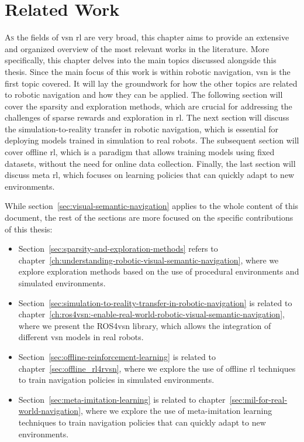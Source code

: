 \chapter{Related Work}\label{ch:related-work}

\lettrine{\textcolor{accent_color}{A}}{s} the fields of \acrshort{vsn} \acrshort{rl} are very broad, this chapter aims to provide an extensive and organized overview of the most relevant works in the literature.
More specifically, this chapter delves into the main topics discussed alongside this thesis.
Since the main focus of this work is within robotic navigation, \acrlong{vsn} is the first topic covered.
It will lay the groundwork for how the other topics are related to robotic navigation and how they can be applied.
The following section will cover the sparsity and exploration methods, which are crucial for addressing the challenges of sparse rewards and exploration in \acrshort{rl}.
The next section will discuss the simulation-to-reality transfer in robotic navigation, which is essential for deploying models trained in simulation to real robots.
The subsequent section will cover offline \acrshort{rl}, which is a paradigm that allows training models using fixed datasets, without the need for online data collection.
Finally, the last section will discuss meta \acrshort{rl}, which focuses on learning policies that can quickly adapt to new environments.

While section~\ref{sec:visual-semantic-navigation} applies to the whole content of this document, the rest of the sections are more focused on the specific contributions of this thesis:

\begin{itemize}
    \item Section~\ref{sec:sparsity-and-exploration-methods} refers to chapter~\ref{ch:understanding-robotic-visual-semantic-navigation}, where we explore exploration methods based on the use of procedural environments and simulated environments.
    \item Section~\ref{sec:simulation-to-reality-transfer-in-robotic-navigation} is related to chapter~\ref{ch:ros4vsn:-enable-real-world-robotic-visual-semantic-navigation}, where we present the ROS4\acrshort{vsn} library, which allows the integration of different \acrshort{vsn} models in real robots.
    \item Section~\ref{sec:offline-reinforcement-learning} is related to chapter~\ref{sec:offline_rl4rvsn}, where we explore the use of offline \acrshort{rl} techniques to train navigation policies in simulated environments.
    \item Section~\ref{sec:meta-imitation-learning} is related to chapter~\ref{sec:mil-for-real-world-navigation}, where we explore the use of meta-imitation learning techniques to train navigation policies that can quickly adapt to new environments.
\end{itemize}

